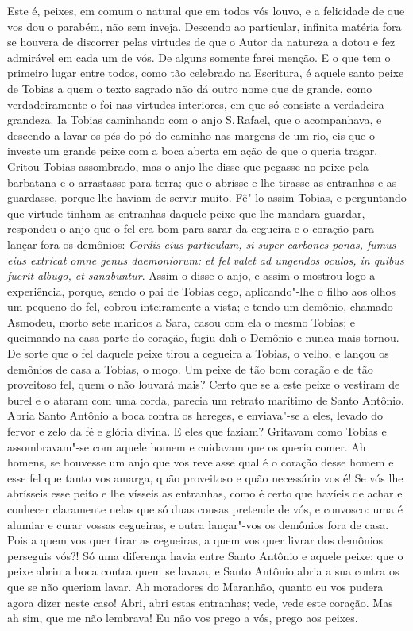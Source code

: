 Este é, peixes, em comum o natural que em todos vós louvo, e a
felicidade de que vos dou o parabém, não sem inveja. Descendo ao
particular, infinita matéria fora se houvera de discorrer pelas virtudes
de que o Autor da natureza a dotou e fez admirável em cada um de vós. De
alguns somente farei menção. E o que tem o primeiro lugar entre todos,
como tão celebrado na Escritura, é aquele santo peixe de Tobias a quem o
texto sagrado não dá outro nome que de grande, como verdadeiramente o
foi nas virtudes interiores, em que só consiste a verdadeira grandeza.
Ia Tobias caminhando com o anjo S.\,Rafael, que o acompanhava, e descendo
a lavar os pés do pó do caminho nas margens de um rio, eis que o investe
um grande peixe com a boca aberta em ação de que o queria tragar. Gritou
Tobias assombrado, mas o anjo lhe disse que pegasse no peixe pela
barbatana e o arrastasse para terra; que o abrisse e lhe tirasse as
entranhas e as guardasse, porque lhe haviam de servir muito. Fê"-lo assim
Tobias, e perguntando que virtude tinham as entranhas daquele peixe que
lhe mandara guardar, respondeu o anjo que o fel era bom para sarar da
cegueira e o coração para lançar fora os demônios: \emph{Cordis eius
particulam, si super carbones ponas, fumus eius extricat omne genus
daemoniorum: et fel valet ad ungendos oculos, in quibus fuerit albugo,
et sanabuntur}. Assim o disse o anjo, e assim o mostrou logo a
experiência, porque, sendo o pai de Tobias cego, aplicando"-lhe o filho
aos olhos um pequeno do fel, cobrou inteiramente a vista; e tendo um
demônio, chamado Asmodeu, morto sete maridos a Sara, casou com ela o
mesmo Tobias; e queimando na casa parte do coração, fugiu dali o Demônio
e nunca mais tornou. De sorte que o fel daquele peixe tirou a cegueira a
Tobias, o velho, e lançou os demônios de casa a Tobias, o moço. Um peixe
de tão bom coração e de tão proveitoso fel, quem o não louvará mais?
Certo que se a este peixe o vestiram de burel e o ataram com uma corda,
parecia um retrato marítimo de Santo Antônio.
Abria Santo Antônio a boca contra os hereges, e enviava"-se a eles,
levado do fervor e zelo da fé e glória divina. E eles que faziam?
Gritavam como Tobias e assombravam"-se com aquele homem e cuidavam que os
queria comer. Ah homens, se houvesse um anjo que vos revelasse qual é o
coração desse homem e esse fel que tanto vos amarga, quão proveitoso e
quão necessário vos é! Se vós lhe abrísseis esse peito e lhe vísseis as
entranhas, como é certo que havíeis de achar e conhecer claramente nelas
que só duas cousas pretende de vós, e convosco: uma é alumiar e curar
vossas cegueiras, e outra lançar"-vos os demônios fora de casa.
Pois a quem vos quer tirar as cegueiras, a quem vos quer livrar dos
demônios perseguis vós?! Só uma diferença havia entre Santo Antônio e
aquele peixe: que o
peixe abriu a boca contra quem se lavava, e Santo Antônio abria a sua
contra os que se não queriam lavar.
Ah moradores do Maranhão, quanto eu vos pudera agora dizer neste caso!
Abri, abri estas entranhas; vede, vede este coração. Mas ah sim, que me
não lembrava! Eu não vos prego a vós, prego aos peixes.

